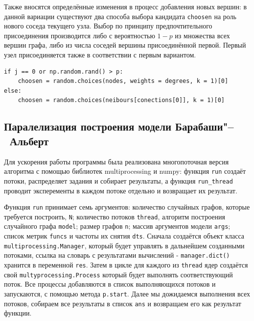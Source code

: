 \documentclass[bachelor, och, diploma]{SCWorks}
\begin{document}
Также вносятся определённые изменения в процесс добавления новых вершин: в данной вариации существуют два способа выбора кандидата \texttt{choosen} на роль нового соседа текущего узла. Выбор по принципу предпочтительного присоединения производится либо с вероятностью $1-p$ из множества всех вершин графа, либо из числа соседей вершины присоединённой первой. Первый узел присоединяется также в соответствии с первым вариантом.
\begin{verbatim}
if j == 0 or np.random.rand() > p:
    choosen = random.choices(nodes, weights = degrees, k = 1)[0]
else:
    choosen = random.choices(neibours[conections[0]], k = 1)[0]
\end{verbatim}
\subsection{Паралелизация построения модели Барабаши"--~Альберт}
Для ускорения работы программы была реализована многопоточная версия алгоритма с помощью библиотек multiprocessing и  numpy: функция \texttt{run} создаёт потоки, распределяет задания и собирает результаты, а функция \linebreak \texttt{run_thread} проводит эксперементы в каждом потоке отдельно и возвращает их результат.

Функция \texttt{run} принимает семь аргументов: количество случайных графов, которые требуется построить, \texttt{N}; количество потоков \texttt{thread}, алгоритм построения случайного графа \texttt{model}; размер графов \texttt{n}; массив аргументов модели \texttt{args}; список метрик \texttt{funcs} и частоты их снятия \texttt{dts}. Сначала создаётся объект класса \texttt{multiprocessing.Manager}, который будет управлять в дальнейшем созданными потоками, ссылка на словарь с результатами вычислений - \texttt{manager.dict()} хранится в переменной \texttt{res}. Затем в цикле для каждого из \texttt{thread} ядер создаётся свой \texttt{multyprocessing.Process} который будет выполнять соответствующий поток. Все процессы добавляются в список выполняющихся потоков и запускаются, с помощью метода \texttt{p.start}. Далее мы дожидаемся выполнения всех потоков, собираем все результаты в список \texttt{ans} и возвращаем его как результат функции.
\end{document}
